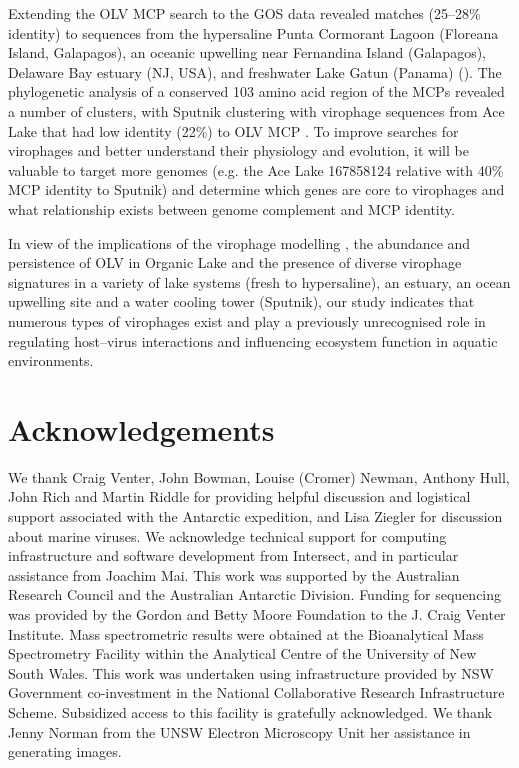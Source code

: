 Extending the \ac{OLV} \ac{MCP} search to the \ac{GOS} data revealed matches (25--28\% identity) to sequences from the hypersaline Punta Cormorant Lagoon (Floreana Island, Galapagos), an oceanic upwelling near Fernandina Island (Galapagos), Delaware Bay estuary (\textsc{NJ}, \textsc{USA}), and freshwater Lake Gatun (Panama) (). 
The phylogenetic analysis of a conserved 103 amino acid region of the \acp{MCP} revealed a number of clusters, with Sputnik clustering with virophage sequences from Ace Lake that had low identity (22\%) to \ac{OLV} \ac{MCP} . 
To improve searches for virophages and better understand their physiology and evolution, it will be valuable to target more genomes (e.g. the Ace Lake 167858124 relative with 40\% MCP identity to Sputnik) and determine which genes are core to virophages and what relationship exists between genome complement and \ac{MCP} identity.
 
In view of the implications of the virophage modelling , the abundance and persistence of \ac{OLV} in Organic Lake and the presence of diverse virophage signatures in a variety of lake systems (fresh to hypersaline), an estuary, an ocean upwelling site and a water cooling tower (Sputnik), our study indicates that numerous types of virophages exist and play a previously unrecognised role in regulating host--virus interactions and influencing ecosystem function in aquatic environments. 


\section{Acknowledgements}
We thank Craig Venter, John Bowman, Louise (Cromer) Newman, Anthony Hull, John Rich and Martin Riddle for providing helpful discussion and logistical support associated with the Antarctic expedition, and Lisa Ziegler for discussion about marine viruses. 
We acknowledge technical support for computing infrastructure and software development from Intersect, and in particular assistance from Joachim Mai. 
This work was supported by the Australian Research Council and the Australian Antarctic Division. 
Funding for sequencing was provided by the Gordon and Betty Moore Foundation to the J. Craig Venter Institute. 
Mass spectrometric results were obtained at the Bioanalytical Mass Spectrometry Facility within the Analytical Centre of the University of New South Wales. 
This work was undertaken using infrastructure provided by NSW Government co-investment in the National Collaborative Research Infrastructure Scheme. 
Subsidized access to this facility is gratefully acknowledged. 
We thank Jenny Norman from the UNSW Electron Microscopy Unit her assistance in generating images. 
